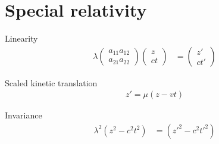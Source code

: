 
\section{Special relativity}
\begin{axm}
	Linearity
	\begin{align*}
		\lambda
		\begin{pmatrix}
			a_{11} a_{12} \\
			a_{21} a_{22}
		\end{pmatrix}
		\begin{pmatrix}
			z \\
			ct
		\end{pmatrix}
		 & =
		\begin{pmatrix}
			z' \\
			ct'
		\end{pmatrix}
	\end{align*}
\end{axm}
\begin{axm}
	Scaled kinetic translation
	\begin{align*}
		z' = \mu(z - vt)
	\end{align*}
\end{axm}
\begin{axm}
	Invariance
	\begin{align*}
		\lambda^2(z^2 - c^2t^2) & = ({z'}^2 - c^2{t'}^2)
	\end{align*}
\end{axm}